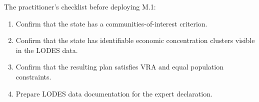 The practitioner's checklist before deploying M.1:
\begin{enumerate}
  \item Confirm that the state has a communities-of-interest criterion.
  \item Confirm that the state has identifiable economic concentration clusters
    visible in the LODES data.
  \item Confirm that the resulting plan satisfies VRA and equal population constraints.
  \item Prepare LODES data documentation for the expert declaration.
\end{enumerate}
